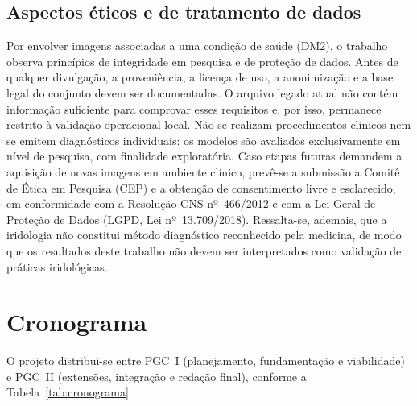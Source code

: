 \documentclass[12pt,a4paper]{article}
\begin{document}
\subsection{Aspectos éticos e de tratamento de dados}
Por envolver imagens associadas a uma condição de saúde (DM2), o trabalho observa princípios de
integridade em pesquisa e de proteção de dados. Antes de qualquer divulgação, a proveniência, a
licença de uso, a anonimização e a base legal do conjunto devem ser documentadas. O arquivo legado
atual não contém informação suficiente para comprovar esses requisitos e, por isso, permanece restrito
à validação operacional local.
Não se realizam procedimentos clínicos nem se emitem diagnósticos individuais: os modelos são avaliados
exclusivamente em nível de pesquisa, com finalidade exploratória. Caso etapas futuras demandem a
aquisição de novas imagens em ambiente clínico, prevê-se a submissão a Comitê de Ética em Pesquisa
(CEP) e a obtenção de consentimento livre e esclarecido, em conformidade com a Resolução CNS
nº~466/2012 e com a Lei Geral de Proteção de Dados (LGPD, Lei nº~13.709/2018). Ressalta-se, ademais,
que a iridologia não constitui método diagnóstico reconhecido pela medicina, de modo que os resultados
deste trabalho não devem ser interpretados como validação de práticas iridológicas.

\section{Cronograma}

O projeto distribui-se entre PGC~I (planejamento, fundamentação e viabilidade) e PGC~II (extensões,
integração e redação final), conforme a Tabela~\ref{tab:cronograma}.
\end{document}
